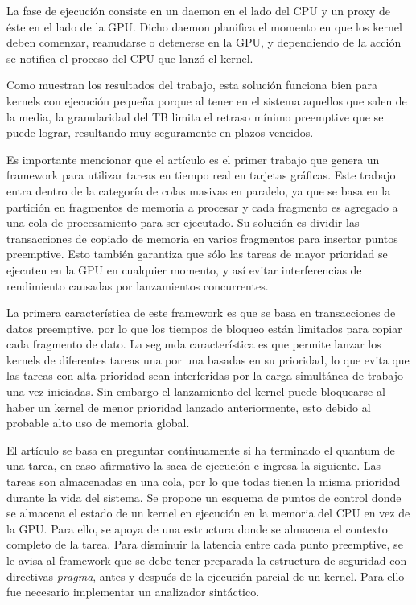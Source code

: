 La fase de ejecución consiste en un daemon en el lado del CPU y un proxy de éste en el lado de la GPU. Dicho daemon planifica el momento en que los kernel deben comenzar, reanudarse o detenerse en la GPU, y dependiendo de la acción se notifica el proceso del CPU que lanzó el kernel.
\newline

Como muestran los resultados del trabajo, esta solución funciona bien para kernels con ejecución pequeña porque al tener en el sistema aquellos que salen de la media, la granularidad del TB limita el retraso mínimo preemptive que se puede lograr, resultando muy seguramente en plazos vencidos.
\newline
 
 Es importante mencionar que el artículo \cite{RGEM} es el primer trabajo que genera un framework para utilizar tareas en tiempo real en tarjetas gráficas. 
 Este trabajo entra dentro de la categoría de colas masivas en paralelo, ya que se basa en la partición en fragmentos de memoria a procesar y cada fragmento es agregado a una cola de procesamiento para ser ejecutado. Su solución es dividir las transacciones de copiado de memoria en varios fragmentos para insertar puntos preemptive. 
 Esto también garantiza que sólo las tareas de mayor prioridad se ejecuten en la GPU en cualquier momento, y así evitar interferencias de rendimiento causadas por lanzamientos concurrentes.
\newline
	
	La primera característica de este framework es que se basa en transacciones de datos preemptive, por lo que los tiempos de bloqueo están limitados para copiar cada fragmento de dato. La segunda característica es que permite lanzar los kernels de diferentes tareas una por una basadas en su prioridad, lo que evita que las tareas con alta prioridad sean interferidas por la carga simultánea de trabajo una vez iniciadas. 
	Sin embargo el lanzamiento del kernel puede bloquearse al haber un kernel de menor prioridad lanzado anteriormente, esto debido al probable alto uso de memoria global.
\newline

El artículo \cite{PreeK} se basa en preguntar continuamente si ha terminado el quantum de una tarea, en caso afirmativo la saca de ejecución e ingresa la siguiente. Las tareas son almacenadas en una cola, por lo que todas tienen la misma prioridad durante la vida del sistema. Se propone un esquema de puntos de control donde se almacena el estado de un kernel en ejecución en la memoria del CPU en vez de la GPU. Para ello, se apoya de una estructura donde se almacena el contexto completo de la tarea. 
Para disminuir la latencia entre cada punto preemptive, se le avisa al framework que se debe tener preparada la estructura de seguridad con directivas \textit{pragma}, antes y después de la ejecución parcial de un kernel. Para ello fue necesario implementar un analizador sintáctico.
\newline

